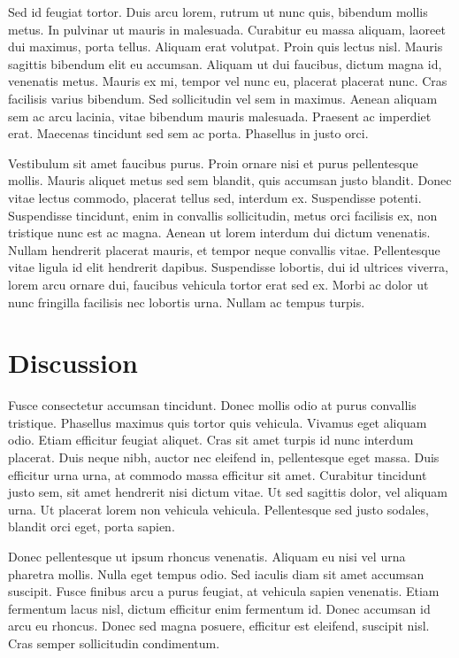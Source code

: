 \documentclass{article}
\begin{document}
Sed id feugiat tortor. Duis arcu lorem, rutrum ut nunc quis, bibendum mollis metus. In pulvinar ut mauris in malesuada. Curabitur eu massa aliquam, laoreet dui maximus, porta tellus. Aliquam erat volutpat. Proin quis lectus nisl. Mauris sagittis bibendum elit eu accumsan. Aliquam ut dui faucibus, dictum magna id, venenatis metus. Mauris ex mi, tempor vel nunc eu, placerat placerat nunc. Cras facilisis varius bibendum. Sed sollicitudin vel sem in maximus. Aenean aliquam sem ac arcu lacinia, vitae bibendum mauris malesuada. Praesent ac imperdiet erat. Maecenas tincidunt sed sem ac porta. Phasellus in justo orci.

Vestibulum sit amet faucibus purus. Proin ornare nisi et purus pellentesque mollis. Mauris aliquet metus sed sem blandit, quis accumsan justo blandit. Donec vitae lectus commodo, placerat tellus sed, interdum ex. Suspendisse potenti. Suspendisse tincidunt, enim in convallis sollicitudin, metus orci facilisis ex, non tristique nunc est ac magna. Aenean ut lorem interdum dui dictum venenatis. Nullam hendrerit placerat mauris, et tempor neque convallis vitae. Pellentesque vitae ligula id elit hendrerit dapibus. Suspendisse lobortis, dui id ultrices viverra, lorem arcu ornare dui, faucibus vehicula tortor erat sed ex. Morbi ac dolor ut nunc fringilla facilisis nec lobortis urna. Nullam ac tempus turpis.
\section{Discussion}
Fusce consectetur accumsan tincidunt. Donec mollis odio at purus convallis tristique. Phasellus maximus quis tortor quis vehicula. Vivamus eget aliquam odio. Etiam efficitur feugiat aliquet. Cras sit amet turpis id nunc interdum placerat. Duis neque nibh, auctor nec eleifend in, pellentesque eget massa. Duis efficitur urna urna, at commodo massa efficitur sit amet. Curabitur tincidunt justo sem, sit amet hendrerit nisi dictum vitae. Ut sed sagittis dolor, vel aliquam urna. Ut placerat lorem non vehicula vehicula. Pellentesque sed justo sodales, blandit orci eget, porta sapien.

Donec pellentesque ut ipsum rhoncus venenatis. Aliquam eu nisi vel urna pharetra mollis. Nulla eget tempus odio. Sed iaculis diam sit amet accumsan suscipit. Fusce finibus arcu a purus feugiat, at vehicula sapien venenatis. Etiam fermentum lacus nisl, dictum efficitur enim fermentum id. Donec accumsan id arcu eu rhoncus. Donec sed magna posuere, efficitur est eleifend, suscipit nisl. Cras semper sollicitudin condimentum.
\end{document}
